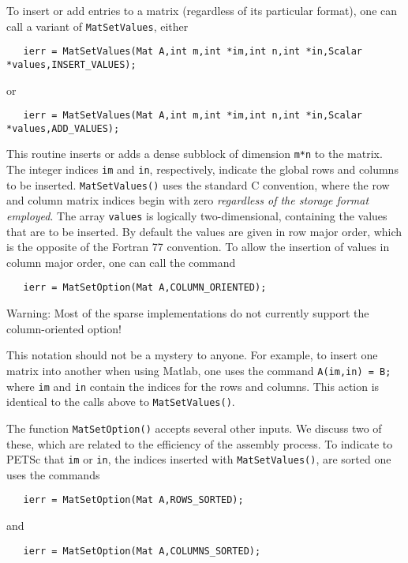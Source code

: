 To insert or add entries to a matrix (regardless of its particular format), 
one can call a variant of {\tt MatSetValues}, either 
\begin{verbatim}
   ierr = MatSetValues(Mat A,int m,int *im,int n,int *in,Scalar *values,INSERT_VALUES);
\end{verbatim}
or 
\begin{verbatim}
   ierr = MatSetValues(Mat A,int m,int *im,int n,int *in,Scalar *values,ADD_VALUES);
\end{verbatim}
This routine inserts or adds a dense subblock of dimension {\tt m*n} to the 
matrix. The integer indices {\tt im} and {\tt in}, respectively, indicate the 
global rows and columns to be inserted.  {\tt MatSetValues()} uses the 
standard C convention, where the row and column matrix indices begin with 
zero {\em regardless of the storage format employed}.   The array 
{\tt values} is logically two-dimensional, containing the values that are 
to be inserted.   
By default the values are given in row major order, which is the opposite 
of the Fortran 77 convention. To allow the insertion of values in column 
major order, one can call the command 
\begin{verbatim}
   ierr = MatSetOption(Mat A,COLUMN_ORIENTED);
\end{verbatim}
Warning: Most of the sparse implementations do not currently support
the column-oriented option!

This notation should not be a mystery to anyone. For example, 
to insert one matrix into another when using Matlab, one uses the command 
{\tt A(im,in) = B;} where {\tt im} and {\tt in} contain the indices for the
rows and columns. This action is identical to the calls above to 
{\tt MatSetValues()}.

The function {\tt MatSetOption()} accepts several other inputs.  
We discuss two of these, which are related to the efficiency of the 
assembly process.  To indicate to PETSc that {\tt im} or {\tt in},
the indices inserted with {\tt MatSetValues()}, are sorted one uses  the 
commands  
\begin{verbatim}
   ierr = MatSetOption(Mat A,ROWS_SORTED);
\end{verbatim}
and 
\begin{verbatim}
   ierr = MatSetOption(Mat A,COLUMNS_SORTED);
\end{verbatim}

